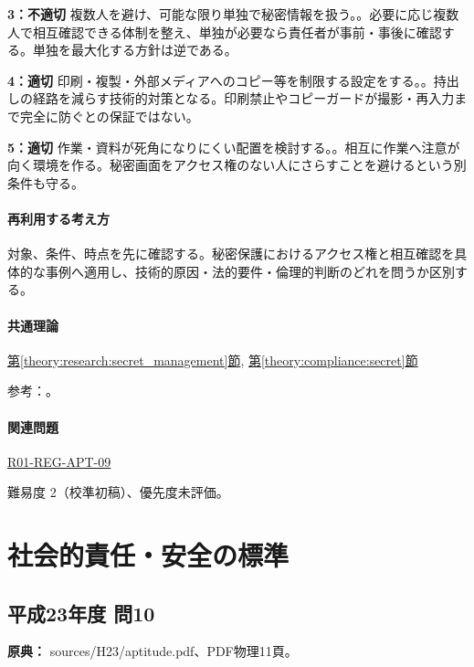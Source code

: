 \noindent\textbf{3：不適切} 複数人を避け、可能な限り単独で秘密情報を扱う。。必要に応じ複数人で相互確認できる体制を整え、単独が必要なら責任者が事前・事後に確認する。単独を最大化する方針は逆である。\par

\noindent\textbf{4：適切} 印刷・複製・外部メディアへのコピー等を制限する設定をする。。持出しの経路を減らす技術的対策となる。印刷禁止やコピーガードが撮影・再入力まで完全に防ぐとの保証ではない。\par

\noindent\textbf{5：適切} 作業・資料が死角になりにくい配置を検討する。。相互に作業へ注意が向く環境を作る。秘密画面をアクセス権のない人にさらすことを避けるという別条件も守る。\par

\paragraph{再利用する考え方} 対象、条件、時点を先に確認する。秘密保護におけるアクセス権と相互確認を具体的な事例へ適用し、技術的原因・法的要件・倫理的判断のどれを問うか区別する。

\paragraph{共通理論} \hyperref[theory:research:secret_management]{第\ref*{theory:research:secret_management}節}, \hyperref[theory:compliance:secret]{第\ref*{theory:compliance:secret}節}

\par 参考：\cite{meti_secret_handbook2024}。

\paragraph{関連問題} \hyperref[q:r01-reg-apt-09]{R01-REG-APT-09}

\par 難易度 2（校準初稿）、優先度未評価。

\section{社会的責任・安全の標準}

\subsection{平成23年度 問10}
\label{q:h23-reg-apt-10}

\noindent\textbf{原典：} sources/H23/aptitude.pdf、PDF物理11頁。

